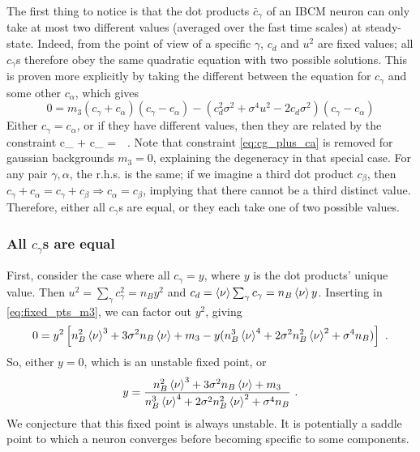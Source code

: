The first thing to notice is that the dot products $\bar{c}_{\gamma}$ of an IBCM neuron can only take at most two different values (averaged over the fast time scales) at steady-state. Indeed, from the point of view of a specific $\gamma$, $c_d$ and $u^2$ are fixed values; all $c_{\gamma}$s therefore obey the same quadratic equation with two possible solutions. This is proven more explicitly by taking the different between the equation for $c_{\gamma}$ and some other $c_{\alpha}$, which gives
\begin{equation}
	0 = m_3 (c_{\gamma} + c_{\alpha})(c_{\gamma} - c_{\alpha}) - (c_d^2 \sigma^2 + \sigma^4 u^2 - 2c_d \sigma^2) (c_{\gamma} - c_{\alpha})
	\label{eq:difference_cg_eqs}
\end{equation}
Either $c_{\gamma} = c_{\alpha}$, or if they have different values, then they are related by the constraint
\beq
	c_{\gamma} + c_{\alpha} =  \,\, .
	\label{eq:cg_plus_ca}
\eeq
Note that constraint \eqref{eq:cg_plus_ca} is removed for gaussian backgrounds $m_3=0$, explaining the degeneracy in that special case. 
For any pair $\gamma, \alpha$, the r.h.s. is the same; if we imagine a third dot product $c_{\beta}$, then $c_{\gamma} + c_{\alpha} = c_{\gamma} + c_{\beta} \Rightarrow c_{\alpha} = c_{\beta}$, implying that there cannot be a third distinct value. Therefore, either all $c_{\gamma}$s are equal, or they each take one of two possible values. 

\subsubsection{All $c_{\gamma}$s are equal}
First, consider the case where all $c_{\gamma} = y$, where $y$ is the dot products' unique value. Then $u^2 = \sum_{\gamma} c_{\gamma}^2 = n_B y^2$ and $c_d = \braket{\nu} \sum_{\gamma} c_{\gamma} = n_B \braket{\nu} y$. Inserting in \eqref{eq:fixed_pts_m3}, we can factor out $y^2$, giving
\begin{equation}
	0 = y^2 \left[n_B^2 \braket{\nu}^3 + 3 \sigma^2 n_B \braket{\nu} + m_3 - y(n_B^3 \braket{\nu}^4 + 2 \sigma^2 n_B^2 \braket{\nu}^2 + \sigma^4 n_B) \right] \,\, .
	\label{eq:all_cg_equal}
\end{equation}
So, either $y=0$, which is an unstable fixed point, or 
\begin{equation}
y = \frac{n_B^2 \braket{\nu}^3 + 3 \sigma^2 n_B \braket{\nu} + m_3}{n_B^3 \braket{\nu}^4 + 2 \sigma^2 n_B^2 \braket{\nu}^2 + \sigma^4 n_B} \,\, .
\label{eq:all_cg_equal_solution}
\end{equation}
We conjecture that this fixed point is always unstable. It is potentially a saddle point to which a neuron converges before becoming specific to some components. 

